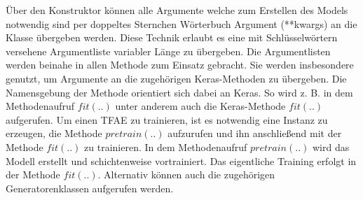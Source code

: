 	Über den Konstruktor können alle Argumente welche zum Erstellen des Models notwendig sind per doppeltes Sternchen Wörterbuch Argument (**kwargs) an die Klasse übergeben werden. Diese Technik erlaubt es eine mit Schlüsselwörtern versehene Argumentliste variabler Länge zu übergeben. Die Argumentlisten werden beinahe in allen Methode zum Einsatz gebracht. Sie werden insbesondere genutzt, um Argumente an die zugehörigen Keras-Methoden zu übergeben. Die Namensgebung der Methode orientiert sich dabei an Keras. So wird z. B. in dem Methodenaufruf $fit(..)$ unter anderem auch die Keras-Methode $fit(..)$ aufgerufen. Um einen TFAE zu trainieren, ist es notwendig eine Instanz zu erzeugen, die Methode $pretrain(..)$ aufzurufen und ihn anschließend mit der Methode $fit(..)$ zu trainieren.
	In dem Methodenaufruf $pretrain(..)$ wird das Modell erstellt und schichtenweise vortrainiert. Das eigentliche Training erfolgt in der Methode $fit(..)$. Alternativ können auch die zugehörigen Generatorenklassen aufgerufen werden.    

